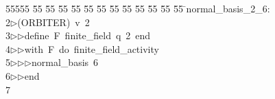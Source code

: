 %
%
\begin{tabbing}
55555 \= 55 \= 55 \= 55 \= 55 \= 55 \= 55 \= 55 \= 55 \= 55 \= 55 \= 55 \= 55 \= \>normal\_basis\_2\_6:\\[0pt]
2\>$\triangleright$\>(ORBITER)\ v\ 2\ \\[0pt]
3\>$\triangleright$\>$\triangleright$\>define\ F\ finite\_field\ q\ 2\ end\ \\[0pt]
4\>$\triangleright$\>$\triangleright$\>with\ F\ do\ finite\_field\_activity\ \\[0pt]
5\>$\triangleright$\>$\triangleright$\>$\triangleright$\>normal\_basis\ 6\ \\[0pt]
6\>$\triangleright$\>$\triangleright$\>end\\[0pt]
7\>\end{tabbing}
